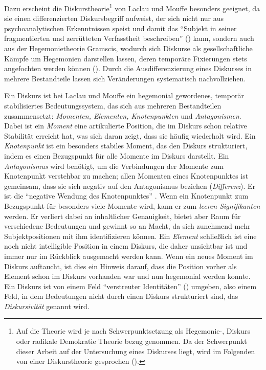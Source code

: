 \documentclass[12pt, titlepage=true, toc=bib]{scrartcl}
\begin{document}
Dazu erscheint die Diskurstheorie\footnote{Auf die Theorie wird je nach Schwerpunktsetzung als Hegemonie-, Diskurs oder radikale Demokratie Theorie bezug genommen. Da der Schwerpunkt dieser Arbeit auf der Untersuchung eines Diskurses liegt, wird im Folgenden von einer Diskurstheorie gesprochen (\cite[vgl.][]{nonhoff_diskurs_2007-1}).} von Laclau und Mouffe besonders geeignet, da sie einen differenzierten Diskursbegriff aufweist, der sich nicht nur aus psychoanalytischen Erkenntnissen speist und damit das "`Subjekt in seiner fragmentierten und zerrütteten Verfasstheit beschreiben"' (\cite[198]{nonhoff_kollektive_2007}) kann, sondern auch aus der Hegemonietheorie Gramscis, wodurch sich Diskurse als gesellschaftliche Kämpfe um Hegemonien darstellen lassen, deren temporäre Fixierungen stets angefochten werden können (\cite[vgl.][8-9]{nonhoff_diskurs_2007-1}). Durch die Ausdifferenzierung eines Diskurses in mehrere Bestandteile lassen sich Veränderungen systematisch nachvollziehen.

Ein Diskurs ist bei Laclau und Mouffe ein hegemonial gewordenes, temporär stabilisiertes Bedeutungssystem, das sich aus mehreren Bestandteilen zusammensetzt: \textit{Momenten, Elementen, Knotenpunkten} und \textit{Antagonismen}. Dabei ist ein \textit{Moment} eine artikulierte Position, die im Diskurs schon relative Stabilität erreicht hat, was sich daran zeigt, dass sie häufig wiederholt wird. Ein \textit{Knotenpunkt} ist ein besonders stabiles Moment, das den Diskurs strukturiert, indem es einen Bezugspunkt für alle Momente im Diskurs darstellt. Ein \textit{Antagonismus} wird benötigt, um die Verbindungen der Momente zum Knotenpunkt verstehbar zu machen; allen Momenten eines Knotenpunktes ist gemeinsam, dass sie sich negativ auf den Antagonismus beziehen (\textit{Differenz}). Er ist die "`negative Wendung des Knotenpunktes"' \cite[6]{bruell_chancen_2006}. Wenn ein Knotenpunkt zum Bezugspunkt für besonders viele Momente wird, kann er zum \textit{leeren Signifikanten} werden. Er verliert dabei an inhaltlicher Genauigkeit, bietet aber Raum für verschiedene Bedeutungen und gewinnt so an Macht, da sich zunehmend mehr Subjektpositionen mit ihm identifizieren können. Ein \textit{Element} schließlich ist eine noch nicht intelligible Position in einem Diskurs, die daher unsichtbar ist und immer nur im Rückblick ausgemacht werden kann. Wenn ein neues Moment im Diskurs auftaucht, ist dies ein Hinweis darauf, dass die Position vorher als Element schon im Diskurs vorhanden war und nun hegemonial werden konnte. Ein Diskurs ist von einem Feld "`verstreuter Identitäten"' (\cite[vgl.][6]{bruell_chancen_2006}) umgeben, also einem Feld, in dem Bedeutungen nicht durch einen Diskurs strukturiert sind, das \textit{Diskursivität} genannt wird. 
\end{document}
